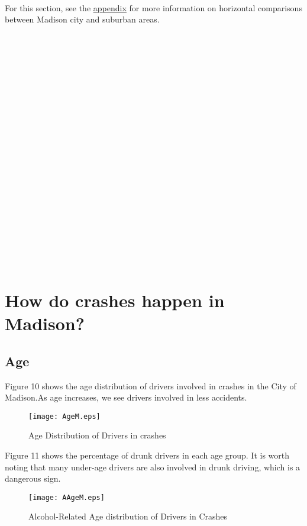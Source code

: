 \documentclass[15pt]{article}
\begin{document}
~\\
~\\
~\\
~\\
~\\
~\\
~\\
~\\
~\\
~\\
~\\
~\\
~\\
\label{sec:When}
For this section, see the \hyperref[sec:When1]{\color{blue} \underline {appendix}} for more information on horizontal comparisons between Madison city and suburban areas.

\newpage
~\\
~\\
~\\
~\\
~\\
~\\
~\\
~\\
~\\
~\\
~\\
~\\
~\\
~\\
~\\
~\\
~\\
~\\
~\\
~\\
\section[20pt]{How do crashes happen in Madison?}

\newpage
\subsection{Age}
Figure 10 shows the age distribution of drivers involved in crashes in the City of Madison.As age increases, we see drivers involved in less accidents.
\begin{figure}[H]
\flushleft
\texttt{[image: AgeM.eps]}
\caption{Age Distribution of Drivers in crashes}
\label{11}
\end{figure}

\newpage
Figure 11 shows the percentage of drunk drivers in each age group. It is worth noting that many under-age drivers are also involved in drunk driving, which is a dangerous sign.
\begin{figure}[H]
\flushleft
\texttt{[image: AAgeM.eps]}
\caption{Alcohol-Related Age distribution of Drivers in Crashes}
\label{12}
\end{figure}
\end{document}
